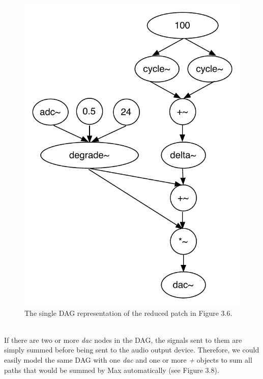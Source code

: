 \documentclass[a4paper,12pt]{report} 	%
\numberwithin{figure}{chapter}
\numberwithin{table}{chapter}
\numberwithin{equation}{chapter}
\begin{document}
\begin{flushleft}
\begin{figure}[h!]
\begin{center}
\includegraphics[scale=0.8]{MaxDAGsSendReceive2}
\caption[Reducing a Set of DAGs to a Single DAG]{The single DAG representation of the reduced patch in Figure 3.6.}
\end{center}
\end{figure}
\\
If there are two or more \emph{dac\texttildelow{}} nodes in the DAG, the signals sent to them are simply summed before being sent to the audio output device. Therefore, we could easily model the same DAG with one \emph{dac\texttildelow{}} and one or more \emph{+\texttildelow{}} objects to sum all paths that would be summed by Max automatically (see Figure 3.8). 
\begin{figure}[h!]
\begin{center}

\end{center}
\end{figure}
\end{flushleft}
\end{document}
